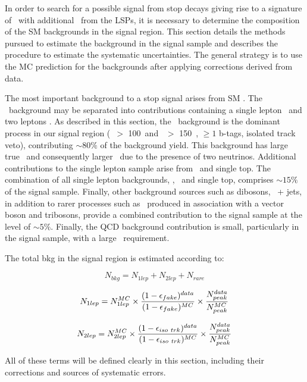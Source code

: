 
In order to search for a possible signal from stop decays giving rise to a signature of \ttbar\ with additional \met\
from the LSPs, it is necessary to determine the composition of the SM backgrounds in the signal region. 
This section details the methods pursued to estimate the background in the signal sample and describes the 
procedure to estimate the systematic uncertainties. The general strategy is to use the MC prediction for the 
backgrounds after applying corrections derived from data. 

The most important background to a stop signal arises from SM \ttbar. The \ttbar\ background may be 
separated into contributions containing a single lepton \ttlj\ and two leptons \ttll. As described in this section, 
the \ttll\ background is the dominant process in our signal region (\met\ $>$ 100~\GeV and \mt\ $>$ 150~\GeV, $\ge 1$ b-tags, isolated track veto),
contributing $\sim 80\%$ of the background yield.
%
This background has large true \met\ and consequently larger \mt\ due to the presence of two neutrinos.
Additional contributions to the single lepton sample arise from \wjets\ and single top. The combination of 
all single lepton backgrounds, \ttlj, \wjets\ and single top, comprises $\sim 15\%$ of the signal sample. 
Finally, other background sources such as dibosons, \dy\ + jets, in addition to rarer processes such as \ttbar\ 
produced in association with a vector boson and tribosons, provide a combined contribution to the signal sample 
at the level of $\sim 5\%$.
Finally, the QCD background contribution is small, particularly in the signal sample, with a large \met\ requirement.

The total bkg in the signal region is estimated according to:

$$ N_{bkg}  = N_{1 lep} + N_{2 lep} + N_{rare} $$

$$ N_{1 lep} = N_{1 lep}^{MC} 
\times 
{(1- \epsilon_{fake})^{data} \over (1 - \epsilon_{fake})^{MC}} 
\times 
{N_{peak}^{data} \over N_{peak}^{MC}}
$$

$$ N_{2 lep} = N_{2 lep}^{MC} 
\times 
{(1- \epsilon_{iso\ trk})^{data} \over (1 - \epsilon_{iso\ trk})^{MC}} 
\times 
{N_{peak}^{data} \over N_{peak}^{MC}}
$$

All of these terms will be defined clearly in this section, including their corrections and sources of systematic errors.
